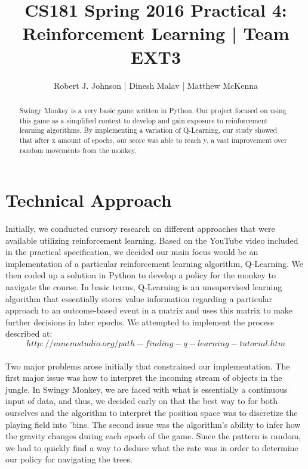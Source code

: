 \documentclass{article}
\begin{document}
\title{CS181 Spring 2016 Practical 4: Reinforcement Learning | Team EXT3}
\author{Robert J. Johnson | Dinesh Malav | Matthew McKenna}


\maketitle

\begin{abstract}
Swingy Monkey is a very basic game written in Python. Our project focused on using this game as a simplified context to develop and gain exposure to reinforcement learning algorithms. By implementing a variation of Q-Learning, our study showed that after x amount of epochs, our score was able to reach y, a vast improvement over random movements from the monkey.
\end{abstract}
\section{Technical Approach}
Initially, we conducted cursory research on different approaches that were available utilizing reinforcement learning. Based on the YouTube video included in the practical specification, we decided our main focus would be an implementation of  a particular reinforcement learning algorithm, Q-Learning. We then coded up a solution in Python to develop a policy for the monkey to navigate the course. In basic terms, Q-Learning is an unsupervised learning algorithm that essentially stores value information regarding a particular approach to an outcome-based event in a matrix and uses this matrix to make further decisions in later epochs. We attempted to implement the process described at:
$$http://mnemstudio.org/path-finding-q-learning-tutorial.htm$$\\
Two major problems arose initially that constrained our implementation. The first major issue was how to interpret the incoming stream of objects in the jungle. In Swingy Monkey, we are faced with what is essentially a continuous input of data, and thus, we decided early on that the best way to for both ourselves and the algorithm to interpret the position space was to discretize the playing field into 'bins. The second issue was the algorithm's ability to infer how the gravity changes during each epoch of the game. Since the pattern is random, we had to quickly find a way to deduce what the rate was in order to determine our policy for navigating the trees.\\\\
\end{document}
